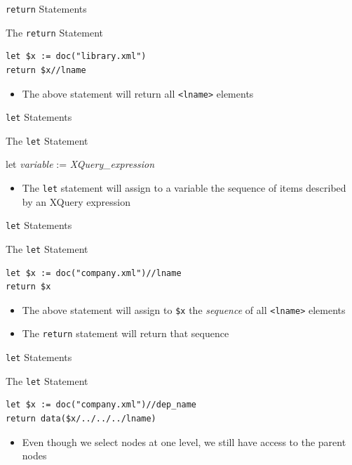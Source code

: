 \documentclass[svgnames]{beamer}
\begin{document}
\begin{frame}[fragile]{\texttt{return} Statements}
\small
\begin{block}{The \texttt{return} Statement}
\begin{verbatim}
let $x := doc("library.xml")
return $x//lname
\end{verbatim}
\end{block}
\normalsize
\begin{itemize}
	\item The above statement will return all \texttt{<lname>} elements
\end{itemize}
\end{frame}

\begin{frame}[fragile]{\texttt{let} Statements}
\small
\begin{block}{The \texttt{let} Statement}
\begin{semiverbatim}
let \textit{variable} := \textit{XQuery\_expression}
\end{semiverbatim}
\end{block}
\normalsize
\begin{itemize}
	\item The \texttt{let} statement will assign to a variable the sequence of items described by an XQuery expression
\end{itemize}
\end{frame}

\begin{frame}[fragile]{\texttt{let} Statements}
\small
\begin{block}{The \texttt{let} Statement}
\begin{verbatim}
let $x := doc("company.xml")//lname
return $x
\end{verbatim}
\end{block}
\normalsize
\begin{itemize}
	\item The above statement will assign to \texttt{\$x} the \textit{sequence} of all \texttt{<lname>} elements
	\item The \texttt{return} statement will return that sequence
\end{itemize}
\end{frame}

\begin{frame}[fragile]{\texttt{let} Statements}
\small
\begin{block}{The \texttt{let} Statement}
\begin{verbatim}
let $x := doc("company.xml")//dep_name
return data($x/../../../lname)
\end{verbatim}
\end{block}
\normalsize
\begin{itemize}
	\item Even though we select nodes at one level, we still have access to the parent nodes
\end{itemize}
\end{frame}
\end{document}
